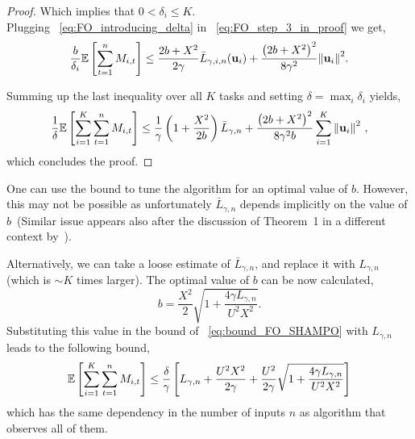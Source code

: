 {\begin{proof}
\noindent
Which implies that $0<\delta_i\le K$.\\
Plugging ~\eqref{eq:FO_introducing_delta} in ~\eqref{eq:FO_step_3_in_proof} we get,
\begin{equation*}
\frac{b}{\delta_i}\mathbb{E}\left[ \sum_{t=1}^{n}{M_{i,t}} \right]
\le \frac{2b+X^2}{2\gamma}{\bar L}_{\gamma,i,n}(\mathbf{u}_{i})+\frac{\left({2b+X^2}\right)^2}{8{\gamma}^2}{\left\Vert \mathbf{u}_{i} \right\Vert}^2.
\end{equation*}

\noindent
Summing up the last inequality over all $K$ tasks and setting $\delta
= \max_i \delta_i$ yields, 
\begin{equation}
\begin{split}
\frac{1}{\delta}\mathbb{E}\left[ \sum_{i=1}^{K}\sum_{t=1}^{n}{M_{i,t}} \right]
\le\frac{1}{\gamma}\left(1+\frac{X^2}{2b} \right){\bar L}_{\gamma,n}+
\frac{\left({2b+X^2}\right)^2}{8{\gamma}^2b}\sum_{i=1}^{K}{{\left\Vert \mathbf{u}_{i} 
\right\Vert}^2}~,
\end{split}
\label{eq:FO_final_eq_in_proof}
\end{equation}
which concludes the proof.
\QED
\end{proof}

\noindent
One can use the bound to tune the algorithm for an optimal value of
$b$. However, this may not be possible as unfortunately ${\bar L}_{\gamma,n}$ depends
implicitly on the value of $b$\ (Similar issue appears also 
after the discussion of Theorem~1 in a different context by~\cite{cesa2006worst}).

\noindent
Alternatively, we can take a
loose estimate of ${\bar L}_{\gamma,n}$, and replace it with
$L_{\gamma,n}$ (which is $\sim K$ times larger). The optimal value of
$b$ can be now calculated, 
\begin{displaymath}
b=\frac{X^2}{2}{\sqrt{1+\frac{4\gamma L_{\gamma,n}}{U^{2}X^2}}}.
\end{displaymath}
Substituting this value in the bound of ~\eqref{eq:bound_FO_SHAMPO} with
$L_{\gamma,n}$ leads to the following bound, 
\begin{equation*}
\mathbb{E}\left[{\sum_{i=1}^{K}\sum_{t=1}^{n}{M_{i,t}}}\right]
\le\frac{\delta}{\gamma}\left[{L_{\gamma,n}+\frac{U^{2}X^2}{2\gamma}+\frac{U^{2}}{2\gamma}\sqrt{1+\frac{4\gamma L_{\gamma,n}}{U^{2}X^2}}}\right]
\end{equation*}
which has the same dependency in the number of inputs $n$ as algorithm
that observes all of them.

}
